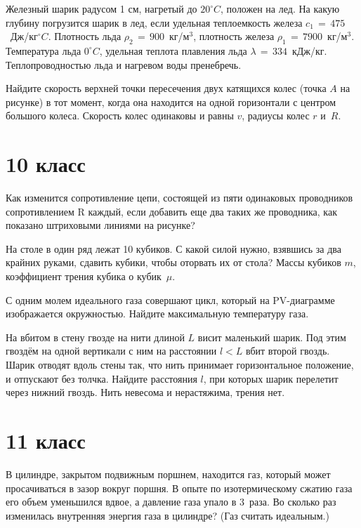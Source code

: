 \AddProb Железный шарик радусом 1 см, нагретый до $20^{\circ}C$, положен на лед. На какую глубину погрузится шарик в лед, если удельная теплоемкость железа 
$c_1\,=\,475$~Дж/кг$^{\circ}C$. Плотность льда $\rho_2\,=\,900$~кг/м$^3$, плотность железа $\rho_1\,=\,7900$~кг/м$^3$. 
Температура льда $0^{\circ}C$, удельная теплота плавления льда $\lambda\,=\,334$~кДж/кг. Теплопроводностью льда и нагревом воды пренебречь.

\AddProb Найдите скорость верхней точки пересечения двух катящихся колес (точка $A$ на рисунке) в тот момент, 
когда она находится на одной горизонтали с центром большого колеса. Скорость колес одинаковы и равны $v$, радиусы колес $r$ и~$R$.



\section{10 класс}

\AddProb Как изменится сопротивление цепи, состоящей из пяти одинаковых проводников сопротивлением R каждый, 
если добавить еще два таких же проводника, как показано штриховыми линиями на рисунке?

\AddProb На столе в один ряд лежат 10 кубиков. С какой силой нужно, взявшись за два крайних руками, сдавить кубики, чтобы оторвать их от стола? 
Массы кубиков $m$, коэффициент трения кубика о кубик~$\mu$.

\AddProb С одним молем идеального газа совершают цикл, который на PV-диаграмме изображается окружностью. Найдите максимальную температуру газа.

\AddProb На вбитом в стену гвозде на нити длиной $L$ висит маленький шарик. 
Под этим гвоздём на одной вертикали с ним на расстоянии $l < L$ вбит второй гвоздь. 
Шарик отводят вдоль стены так, что нить принимает горизонтальное положение, и отпускают без толчка. 
Найдите расстояния $l$, при которых шарик перелетит через нижний гвоздь. Нить невесома и нерастяжима, трения нет.



\section{11 класс}

\AddProb В цилиндре, закрытом подвижным поршнем, находится газ, который может просачиваться в зазор вокруг поршня. 
В опыте по изотермическому сжатию газа его объем уменьшился вдвое, а давление газа упало в 3~раза. 
Во сколько раз изменилась внутренняя энергия газа в цилиндре? (Газ считать идеальным.)


